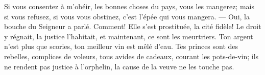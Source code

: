 Si vous consentez à m’obéir, les bonnes choses du pays, vous les mangerez;
	mais si vous refusez, si vous vous obstinez, c’est l’épée qui vous mangera.
	--- Oui, la bouche du Seigneur a parlé.
Comment! Elle s’est prostituée, la cité fidèle!
	Le droit y régnait, la justice l’habitait,
	et maintenant, ce sont les meurtriers.
Ton argent n’est plus que scories, ton meilleur vin est mêlé d’eau.
Tes princes sont des rebelles, complices de voleurs,
	tous avides de cadeaux, courant les pots-de-vin;
	ils ne rendent pas justice à l’orphelin,
	la cause de la veuve ne les touche pas.

